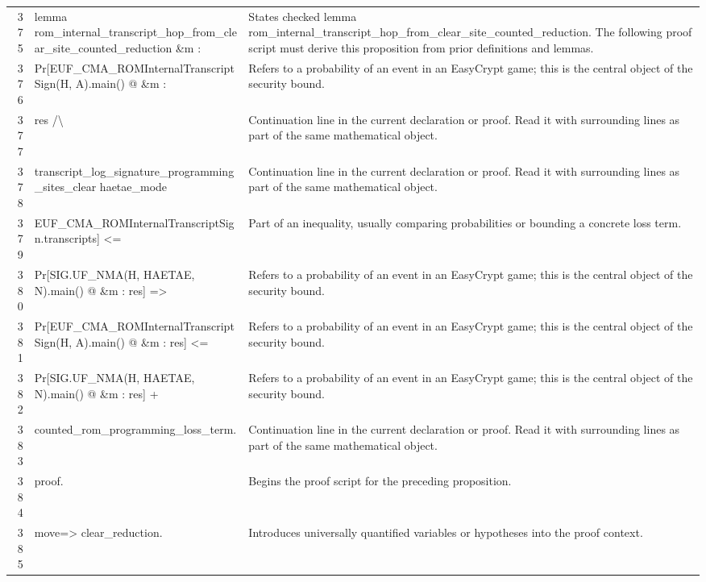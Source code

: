 \documentclass[10pt]{article}
\begin{document}
\begin{longtable}{r L{0.53\textwidth} L{0.37\textwidth}}
375 & {\ttfamily\scriptsize lemma rom\_internal\_transcript\_hop\_from\_clear\_site\_counted\_reduction \&m :} & States checked lemma rom\_internal\_transcript\_hop\_from\_clear\_site\_counted\_reduction.  The following proof script must derive this proposition from prior definitions and lemmas. \\
376 & {\ttfamily\scriptsize   Pr[EUF\_CMA\_ROMInternalTranscriptSign(H, A).main() @ \&m :} & Refers to a probability of an event in an EasyCrypt game; this is the central object of the security bound. \\
377 & {\ttfamily\scriptsize       res /\textbackslash{}} & Continuation line in the current declaration or proof.  Read it with surrounding lines as part of the same mathematical object. \\
378 & {\ttfamily\scriptsize       transcript\_log\_signature\_programming\_sites\_clear haetae\_mode} & Continuation line in the current declaration or proof.  Read it with surrounding lines as part of the same mathematical object. \\
379 & {\ttfamily\scriptsize         EUF\_CMA\_ROMInternalTranscriptSign.transcripts] <=} & Part of an inequality, usually comparing probabilities or bounding a concrete loss term. \\
380 & {\ttfamily\scriptsize     Pr[SIG.UF\_NMA(H, HAETAE, N).main() @ \&m : res] =>} & Refers to a probability of an event in an EasyCrypt game; this is the central object of the security bound. \\
381 & {\ttfamily\scriptsize   Pr[EUF\_CMA\_ROMInternalTranscriptSign(H, A).main() @ \&m : res] <=} & Refers to a probability of an event in an EasyCrypt game; this is the central object of the security bound. \\
382 & {\ttfamily\scriptsize     Pr[SIG.UF\_NMA(H, HAETAE, N).main() @ \&m : res] +} & Refers to a probability of an event in an EasyCrypt game; this is the central object of the security bound. \\
383 & {\ttfamily\scriptsize     counted\_rom\_programming\_loss\_term.} & Continuation line in the current declaration or proof.  Read it with surrounding lines as part of the same mathematical object. \\
384 & {\ttfamily\scriptsize proof.} & Begins the proof script for the preceding proposition. \\
385 & {\ttfamily\scriptsize move=> clear\_reduction.} & Introduces universally quantified variables or hypotheses into the proof context. \\

\end{longtable}
\end{document}
